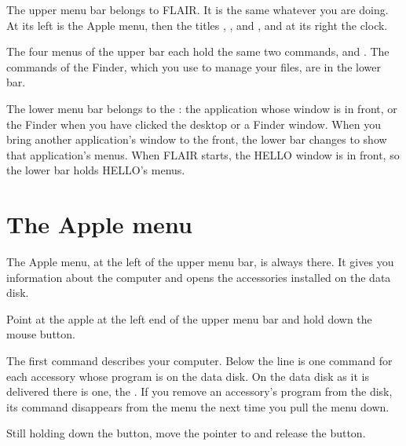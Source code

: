 The upper menu bar belongs to FLAIR.  It is the
same whatever you are doing.  At its left is the Apple menu, then the
titles , ,  and
, and at its right the clock.


The four menus of the upper bar each hold the same two commands,
 and .  The commands of the Finder, which
you use to manage your files, are in the lower bar.

The lower menu bar belongs to the : the application whose window is in front, or the Finder when
you have clicked the desktop or a Finder window.  When you bring another
application's window to the front, the lower bar changes to show that
application's menus.  When FLAIR starts, the HELLO window is in front, so
the lower bar holds HELLO's menus.

\section{The Apple menu}
The Apple menu, at the left of the upper menu bar, is always there.  It
gives you information about the computer and opens the accessories
installed on the data disk.
\begin{TaskSteps}
\Step Point at the apple at the left end of the upper menu bar and hold
down the mouse button.
\end{TaskSteps}


The first command describes your computer.
Below the line is one command for each accessory
whose program is on the data disk.  On the data disk as it is delivered
there is one, the .  If you remove an accessory's
program from the disk, its command disappears from the menu the next time
you pull the menu down.

\begin{TaskSteps}[resume]
\Step Still holding down the button, move the pointer to  and release the button.
\end{TaskSteps}

